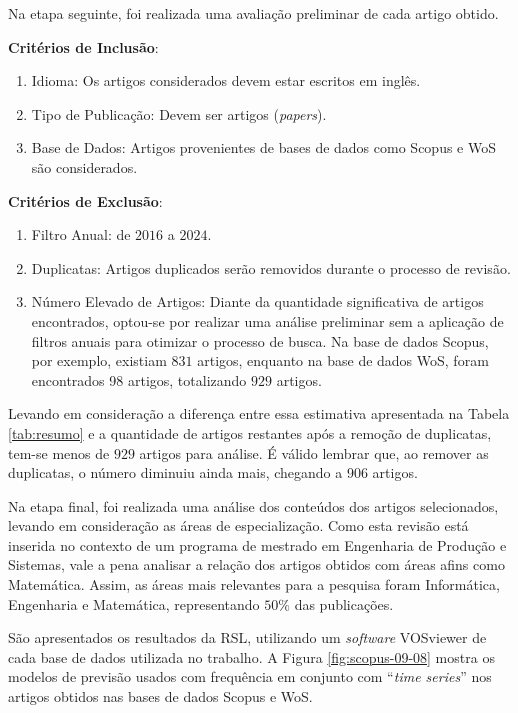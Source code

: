 Na etapa seguinte, foi realizada uma avaliação preliminar de cada artigo obtido.

\noindent\textbf{Critérios de Inclusão}:

\begin{enumerate}
	\item Idioma: Os artigos considerados devem estar escritos em inglês.
	\item Tipo de Publicação: Devem ser artigos (\textit{papers}).
	\item Base de Dados: Artigos provenientes de bases de dados como Scopus e WoS são considerados.
\end{enumerate}

\noindent\textbf{Critérios de Exclusão}:

\begin{enumerate}
	\item Filtro Anual: de $2016$ a $2024$.
	\item Duplicatas: Artigos duplicados serão removidos durante o processo de revisão.
	\item Número Elevado de Artigos: Diante da quantidade significativa de artigos encontrados, optou-se por realizar uma análise preliminar sem a aplicação de filtros anuais para otimizar o processo de busca. Na base de dados Scopus, por exemplo, existiam $831$ artigos, enquanto na base de dados WoS, foram encontrados 98 artigos, totalizando $929$ artigos.
\end{enumerate}


Levando em consideração a diferença entre essa estimativa apresentada na Tabela \ref{tab:resumo} e a quantidade de artigos restantes após a remoção de duplicatas, tem-se menos de $929$ artigos para análise. É válido lembrar que, ao remover as duplicatas, o número diminuiu ainda mais, chegando a 906 artigos.

Na etapa final, foi realizada uma análise dos conteúdos dos artigos selecionados, levando em consideração as áreas de especialização. Como esta revisão está inserida no contexto de um programa de mestrado em Engenharia de Produção e Sistemas, vale a pena analisar a relação dos artigos obtidos com áreas afins como Matemática. Assim, as áreas mais relevantes para a pesquisa foram Informática, Engenharia e Matemática, representando $50\%$ das publicações. 

São apresentados os resultados da RSL, utilizando um \textit{software} VOSviewer de cada base de dados utilizada no trabalho. 
A Figura \ref{fig:scopus-09-08} mostra os modelos de previsão usados com frequência em conjunto com ``\textit{time series}'' nos artigos obtidos nas bases de dados Scopus e WoS. 

